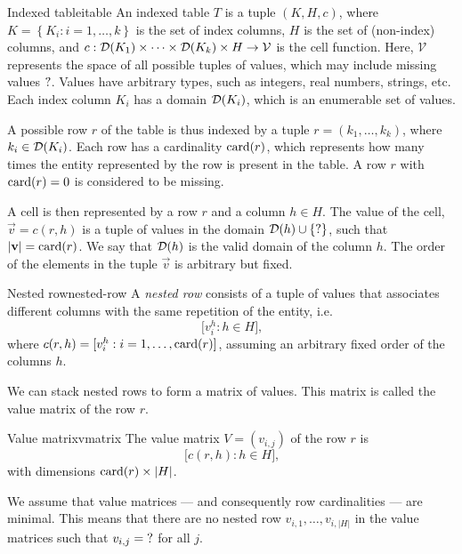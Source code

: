 \begin{defbox}{Indexed table}{itable}
An indexed table $T$ is a tuple $(K, H, c)$, where $K = \left\{K_i : i = 1, \dots,
k\right\}$ is the set of index columns, $H$ is the set of (non-index) columns, and $c :
\domainof{K_1} \times \dots \times \domainof{K_k} \times H \to \mathcal{V}$ is the cell function.
Here, $\mathcal{V}$ represents the space of all possible tuples of values, which
may include missing values $\missing$.  Values have arbitrary types, such as integers,
real numbers, strings, etc.
Each index column $K_i$ has a domain $\domainof{K_i}$, which is an enumerable set of
values.
\end{defbox}

A possible row $r$ of the table is thus indexed by a tuple $r = (k_1, \dots,
k_k)$, where $k_i \in \domainof{K_i}$.  Each row has a cardinality $\rowcard[r]$, which
represents how many times the entity represented by the row is present in the table.
A row $r$ with $\rowcard[r] = 0$ is considered to be missing.

A cell is then represented by a row $r$ and a column $h \in H$.  The value of the cell,
$\vec{v} = c(r, h)$ is a tuple of values in the domain $\domainof{h} \cup \{\missing\}$,
such that $|\vec{v}| = \rowcard[r]$.  We say that $\domainof{h}$ is the valid domain of
the column $h$.
The order of the elements in the tuple $\vec{v}$ is arbitrary but fixed.

\begin{defbox}{Nested row}{nested-row}
A \emph{nested
row} consists of a tuple of values that associates different columns with the same
repetition of the entity, i.e. \[
  \Big[ v^h_i : h \in H \Big]\text{,}
\]
where $c(r, h) = [v^h_i : i = 1, \dots, \rowcard[r]]$, assuming an arbitrary fixed order
of the columns $h$.
\end{defbox}

We can stack nested rows to form a matrix of values.  This matrix is called the value
matrix of the row $r$.

\begin{defbox}{Value matrix}{vmatrix}
The value matrix $V = (v_{i, j})$ of the row $r$ is \[
  \Big[ c(r, h) : h \in H \Big]\text{,}
\] with dimensions $\rowcard[r] \times |H|$.
\end{defbox}

We assume that value matrices --- and consequently row cardinalities --- are minimal. This
means that there are no nested row $v_{i, 1}, \dots, v_{i, |H|}$ in the value matrices
such that $v_{i, j} = \missing$ for all $j$.

